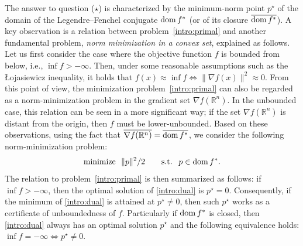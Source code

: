 \documentclass[11pt,a4paper]{article}
\theoremstyle{definition}
\theoremstyle{plain}
\newcommand{\RR}{{\mathbb{R}}}
\newcommand{\dom}{\mathop{\rm dom}}
\begin{document}
The answer to question ($\star$) is characterized by the minimum-norm point $p^\star$ of the domain of the Legendre--Fenchel conjugate $\dom f^\ast$ (or of its closure $\overline{\dom f^\ast}$).
A key observation is a relation between problem~\eqref{intro:primal} and another fundamental problem, \textit{norm minimization in a convex set}, explained as follows.
Let us first consider the case where the objective function $f$ is bounded from below, i.e., $\inf f > -\infty$.
Then, under some reasonable assumptions such as the {\L}ojasiewicz inequality, it holds that $f(x) \approx \inf f \iff \|\nabla f(x)\|^2 \approx 0$.
From this point of view, the minimization problem~\eqref{intro:primal} can also be regarded as a norm-minimization problem in the gradient set $\nabla f(\RR^n)$.
In the unbounded case, this relation can be seen in a more significant way; if the set $\nabla f(\RR^n)$ is distant from the origin, then $f$ must be lower-unbounded.
Based on these observations, using the fact that $\overline{\nabla f(\RR^n)} = \overline{\dom f^\ast}$, we consider the following norm-minimization problem:
\begin{equation}\label{intro:dual}
    \text{minimize }\ \|p\|^2/2 \qquad \text{s.t. }\ p \in \dom f^\ast.
\end{equation}
The relation to problem~\eqref{intro:primal} is then summarized as follows: if $\inf f > -\infty$, then the optimal solution of \eqref{intro:dual} is $p^\star = 0$.
Consequently, if the minimum of \eqref{intro:dual} is attained at $p^\star \neq 0$, then such $p^\star$ works as a certificate of unboundedness of $f$.
Particularly if $\dom f^\ast$ is closed, then \eqref{intro:dual} always has an optimal solution $p^\star$ and the following equivalence holds: $\inf f = -\infty \iff p^\star \neq 0$.
\end{document}
